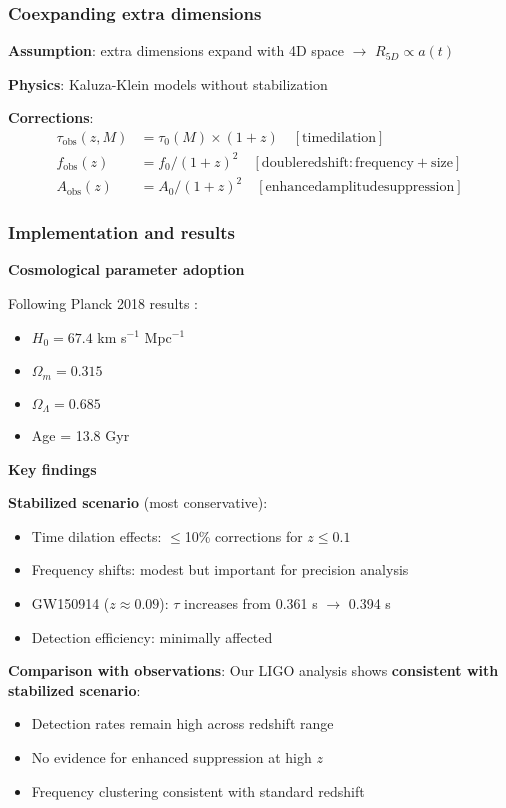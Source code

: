 \documentclass[12pt]{iopart}
\begin{document}
\subsubsection{Coexpanding extra dimensions}

\textbf{Assumption}: extra dimensions expand with 4D space $\to$ $R_{5D} \propto a(t)$

\textbf{Physics}: Kaluza-Klein models without stabilization

\textbf{Corrections}:
\begin{eqnarray}
\tau_{\mathrm{obs}}(z,M) &= \tau_0(M) \times (1+z) \quad \mathrm{[time dilation]} \\
f_{\mathrm{obs}}(z) &= f_0 / (1+z)^2 \quad \mathrm{[double redshift: frequency + size]} \\
A_{\mathrm{obs}}(z) &= A_0 / (1+z)^2 \quad \mathrm{[enhanced amplitude suppression]}
\end{eqnarray}

\subsubsection{Implementation and results}

\textbf{Cosmological parameter adoption}

Following Planck 2018 results \cite{planck2020}:
\begin{itemize}
\item $H_0 = 67.4$ km s$^{-1}$ Mpc$^{-1}$
\item $\Omega_m = 0.315$
\item $\Omega_\Lambda = 0.685$
\item Age = 13.8 Gyr
\end{itemize}

\textbf{Key findings}

\textbf{Stabilized scenario} (most conservative):
\begin{itemize}
\item Time dilation effects: $\leq$10\% corrections for $z\leq 0.1$
\item Frequency shifts: modest but important for precision analysis
\item GW150914 ($z\approx 0.09$): $\tau$ increases from 0.361 s $\to$ 0.394 s
\item Detection efficiency: minimally affected
\end{itemize}

\textbf{Comparison with observations}:
Our LIGO analysis shows \textbf{consistent with stabilized scenario}:
\begin{itemize}
\item Detection rates remain high across redshift range
\item No evidence for enhanced suppression at high $z$
\item Frequency clustering consistent with standard redshift
\end{itemize}
\end{document}
